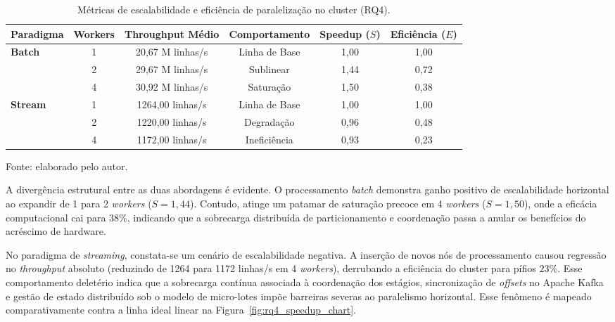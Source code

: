\begin{table}[htbp]
\centering
\caption{Métricas de escalabilidade e eficiência de paralelização no cluster (RQ4).}
\label{tab:rq4_scalability_metrics}
\small
\setlength{\tabcolsep}{6pt}
\begin{tabular}{lccccc}
\toprule
\textbf{Paradigma} & \textbf{Workers} & \textbf{Throughput Médio} & \textbf{Comportamento} & \textbf{Speedup ($S$)} & \textbf{Eficiência ($E$)} \\
\midrule
\textbf{Batch}   & 1 & 20,67 M linhas/s & Linha de Base  & 1,00 & 1,00 \\
                 & 2 & 29,67 M linhas/s & Sublinear      & 1,44 & 0,72 \\
                 & 4 & 30,92 M linhas/s & Saturação      & 1,50 & 0,38 \\
\midrule
\textbf{Stream}  & 1 & 1264,00 linhas/s & Linha de Base  & 1,00 & 1,00 \\
                 & 2 & 1220,00 linhas/s & Degradação     & 0,96 & 0,48 \\
                 & 4 & 1172,00 linhas/s & Ineficiência   & 0,93 & 0,23 \\
\bottomrule
\end{tabular}
\vspace{0.3em}
\begin{flushleft}
\footnotesize Fonte: elaborado pelo autor.
\end{flushleft}
\end{table}

A divergência estrutural entre as duas abordagens é evidente. O processamento \textit{batch} demonstra ganho positivo de escalabilidade horizontal ao expandir de 1 para 2 \textit{workers} ($S = 1{,}44$). Contudo, atinge um patamar de saturação precoce em 4 \textit{workers} ($S = 1{,}50$), onde a eficácia computacional cai para $38\%$, indicando que a sobrecarga distribuída de particionamento e coordenação passa a anular os benefícios do acréscimo de hardware.

No paradigma de \textit{streaming}, constata-se um cenário de escalabilidade negativa. A inserção de novos nós de processamento causou regressão no \textit{throughput} absoluto (reduzindo de 1264 para 1172 linhas/s em 4 \textit{workers}), derrubando a eficiência do cluster para pífios $23\%$. Esse comportamento deletério indica que a sobrecarga contínua associada à coordenação dos estágios, sincronização de \textit{offsets} no Apache Kafka e gestão de estado distribuído sob o modelo de micro-lotes impõe barreiras severas ao paralelismo horizontal. Esse fenômeno é mapeado comparativamente contra a linha ideal linear na Figura~\ref{fig:rq4_speedup_chart}.

